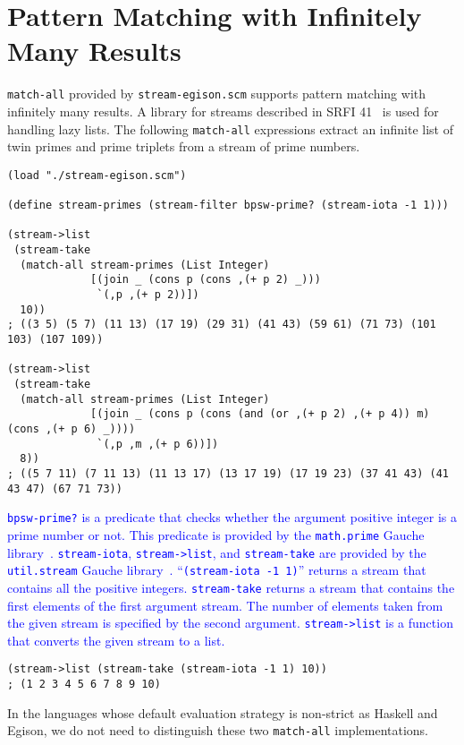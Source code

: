 \documentclass[acmlarge]{acmart}
\newcommand{\new}[1]{\textcolor{blue}{#1}}
\begin{document}
\section{Pattern Matching with Infinitely Many Results}\label{pm-inf}

\lstinline{match-all} provided by \texttt{stream-egison.scm} supports pattern matching with infinitely many results.
A library for streams described in SRFI 41~\cite{bewig2007scheme} is used for handling lazy lists.
The following \lstinline{match-all} expressions extract an infinite list of twin primes and prime triplets from a stream of prime numbers.

\begin{lstlisting}[language=egison]
(load "./stream-egison.scm")

(define stream-primes (stream-filter bpsw-prime? (stream-iota -1 1)))

(stream->list
 (stream-take
  (match-all stream-primes (List Integer)
             [(join _ (cons p (cons ,(+ p 2) _)))
              `(,p ,(+ p 2))])
  10))
; ((3 5) (5 7) (11 13) (17 19) (29 31) (41 43) (59 61) (71 73) (101 103) (107 109))

(stream->list
 (stream-take
  (match-all stream-primes (List Integer)
             [(join _ (cons p (cons (and (or ,(+ p 2) ,(+ p 4)) m) (cons ,(+ p 6) _))))
              `(,p ,m ,(+ p 6))])
  8))
; ((5 7 11) (7 11 13) (11 13 17) (13 17 19) (17 19 23) (37 41 43) (41 43 47) (67 71 73))
\end{lstlisting}

\noindent
\new{
\lstinline{bpsw-prime?} is a predicate that checks whether the argument positive integer is a prime number or not.
This predicate is provided by the \texttt{math.prime} Gauche library~\cite{gauchePN}.
\lstinline{stream-iota}, \lstinline{stream->list}, and \lstinline{stream-take} are provided by the \texttt{util.stream} Gauche library~\cite{gaucheST}.
``\lstinline{(stream-iota -1 1)}'' returns a stream that contains all the positive integers.
\lstinline{stream-take} returns a stream that contains the first elements of the first argument stream.
The number of elements taken from the given stream is specified by the second argument.
\lstinline{stream->list} is a function that converts the given stream to a list.
}%

\begin{lstlisting}[language=egison]
(stream->list (stream-take (stream-iota -1 1) 10))
; (1 2 3 4 5 6 7 8 9 10)
\end{lstlisting}



In the languages whose default evaluation strategy is non-strict as Haskell and Egison, we do not need to distinguish these two \lstinline{match-all} implementations.
\end{document}
